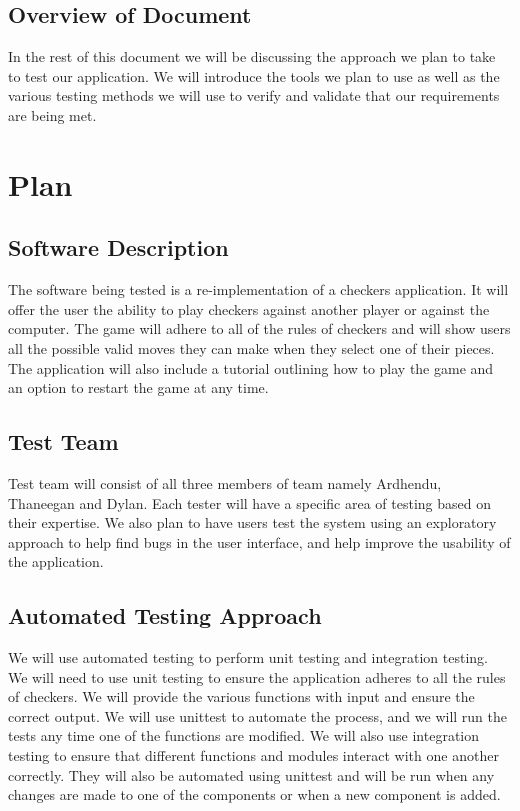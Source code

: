 \documentclass[12pt, titlepage]{article}
\begin{document}

\subsection{Overview of Document}
In the rest of this document we will be discussing the approach we plan to take to test our application. We will introduce the tools we plan to use as well as the various testing methods we will use to verify and validate that our requirements are being met.
\section{Plan}
	
\subsection{Software Description}
The software being tested is a re-implementation of a checkers application. It will offer the user the ability to play checkers against another player or against the computer. The game will adhere to all of the rules of checkers and will show users all the possible valid moves they can make when they select one of their pieces. The application will also include a tutorial outlining how to play the game and an option to restart the game at any time.

\subsection{Test Team}
Test team will consist of all three members of team namely Ardhendu, Thaneegan and Dylan. Each tester will have a specific area of testing based on their expertise. We also plan to have users test the system using an exploratory approach to help find bugs in the user interface, and help improve the usability of the application.

\subsection{Automated Testing Approach}
We will use automated testing to perform unit testing and integration testing. We will need to use unit testing to ensure the application adheres to all the rules of checkers. We will provide the various functions with input and ensure the correct output. We will use unittest to automate the process, and we will run the tests any time one of the functions are modified. We will also use integration testing to ensure that different functions and modules interact with one another correctly. They will also be automated using unittest and will be run when any changes are made to one of the components or when a new component is added.
\end{document}

